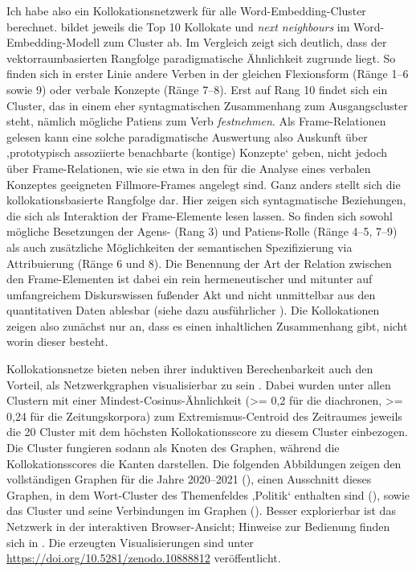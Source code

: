 Ich habe also ein Kollokationsnetzwerk für alle Word-Embedding-Cluster berechnet.  bildet jeweils die Top 10 Kollokate und \emph{next neighbours} im Word-Embedding-Modell zum Cluster  ab. Im Vergleich zeigt sich deutlich, dass der vektorraumbasierten Rangfolge paradigmatische Ähnlichkeit zugrunde liegt. So finden sich in erster Linie andere Verben in der gleichen Flexionsform (Ränge 1--6 sowie 9) oder verbale Konzepte (Ränge 7--8). Erst auf Rang 10 findet sich ein Cluster, das in einem eher syntagmatischen Zusammenhang zum Ausgangscluster steht, nämlich mögliche Patiens zum Verb \emph{festnehmen}. Als Frame-Relationen gelesen kann eine solche paradigmatische Auswertung also Auskunft über ‚prototypisch assoziierte benachbarte (kontige) Konzepte` \autocite{busseFrameSemantikKompendium2012} geben, nicht jedoch über Frame-Relationen, wie sie etwa in den für die Analyse eines verbalen Konzeptes geeigneten Fillmore-Frames angelegt sind. Ganz anders stellt sich die kollokationsbasierte Rangfolge dar. Hier zeigen sich syntagmatische Beziehungen, die sich als Interaktion der Frame-Elemente lesen lassen. So finden sich sowohl mögliche Besetzungen der Agens- (Rang 3) und Patiens-Rolle (Ränge 4--5, 7--9) als auch zusätzliche Möglichkeiten der semantischen Spezifizierung via Attribuierung (Ränge 6 und 8). Die Benennung der Art der Relation zwischen den Frame-Elementen ist dabei ein rein hermeneutischer und mitunter auf umfangreichem Diskurswissen fußender Akt und nicht unmittelbar aus den quantitativen Daten ablesbar (siehe dazu ausführlicher ). Die Kollokationen zeigen also zunächst nur an, dass es einen inhaltlichen Zusammenhang gibt, nicht worin dieser besteht.

Kollokationsnetze bieten neben ihrer induktiven Berechenbarkeit auch den Vorteil, als Netzwerkgraphen visualisierbar zu sein \autocite[siehe ausführlich zu Netzwerkgraphen in der Linguistik][179-192]{bubenhoferVisuelleLinguistikZur2020}. Dabei wurden unter allen Clustern mit einer Mindest-Cosinus-Ähnlichkeit (\textgreater= 0,2 für die diachronen, \textgreater= 0,24 für die Zeitungskorpora) zum Extremismus-Centroid des Zeitraumes jeweils die 20 Cluster mit dem höchsten Kollokationsscore zu diesem Cluster einbezogen. Die Cluster fungieren sodann als Knoten des Graphen, während die Kollokationsscores die Kanten darstellen. Die folgenden Abbildungen zeigen den vollständigen Graphen für die Jahre 2020--2021 (), einen Ausschnitt dieses Graphen, in dem Wort-Cluster des Themenfeldes ‚Politik` enthalten sind (), sowie das Cluster  und seine Verbindungen im Graphen (). Besser explorierbar ist das Netzwerk in der interaktiven Browser-Ansicht; Hinweise zur Bedienung finden sich in . Die erzeugten Visualisierungen sind unter \url{https://doi.org/10.5281/zenodo.10888812} veröffentlicht.

